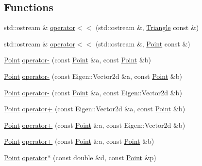 \subsection*{Functions}
\begin{DoxyCompactItemize}
\item 
std\-::ostream \& \hyperlink{namespaceTspeed_1_1Geo_aa258344d03758569a10613ac9e9c6321}{operator$<$$<$} (std\-::ostream \&, \hyperlink{classTspeed_1_1Geo_1_1Triangle}{Triangle} const \&)
\item 
std\-::ostream \& \hyperlink{namespaceTspeed_1_1Geo_a53dbf4dff78a9df28c8c7d1650c6680e}{operator$<$$<$} (std\-::ostream \&, \hyperlink{classTspeed_1_1Geo_1_1Point}{Point} const \&)
\item 
\hyperlink{classTspeed_1_1Geo_1_1Point}{Point} \hyperlink{namespaceTspeed_1_1Geo_adf8407948a35f7e96d5d799fa15b3650}{operator-\/} (const \hyperlink{classTspeed_1_1Geo_1_1Point}{Point} \&a, const \hyperlink{classTspeed_1_1Geo_1_1Point}{Point} \&b)
\item 
\hyperlink{classTspeed_1_1Geo_1_1Point}{Point} \hyperlink{namespaceTspeed_1_1Geo_a4ef6e700bdff1154b2721acce23cf6ad}{operator-\/} (const Eigen\-::\-Vector2d \&a, const \hyperlink{classTspeed_1_1Geo_1_1Point}{Point} \&b)
\item 
\hyperlink{classTspeed_1_1Geo_1_1Point}{Point} \hyperlink{namespaceTspeed_1_1Geo_a0a9c1c3252be0ddaf17736746ec30c24}{operator-\/} (const \hyperlink{classTspeed_1_1Geo_1_1Point}{Point} \&a, const Eigen\-::\-Vector2d \&b)
\item 
\hyperlink{classTspeed_1_1Geo_1_1Point}{Point} \hyperlink{namespaceTspeed_1_1Geo_af80150ec8874a02114d3c1761e668e8f}{operator+} (const Eigen\-::\-Vector2d \&a, const \hyperlink{classTspeed_1_1Geo_1_1Point}{Point} \&b)
\item 
\hyperlink{classTspeed_1_1Geo_1_1Point}{Point} \hyperlink{namespaceTspeed_1_1Geo_a9ba1b73207379c959a394ef5e51d7f01}{operator+} (const \hyperlink{classTspeed_1_1Geo_1_1Point}{Point} \&a, const Eigen\-::\-Vector2d \&b)
\item 
\hyperlink{classTspeed_1_1Geo_1_1Point}{Point} \hyperlink{namespaceTspeed_1_1Geo_a02b319fb63838ccd1fba19d6639dcd2e}{operator+} (const \hyperlink{classTspeed_1_1Geo_1_1Point}{Point} \&a, const \hyperlink{classTspeed_1_1Geo_1_1Point}{Point} \&b)
\item 
\hyperlink{classTspeed_1_1Geo_1_1Point}{Point} \hyperlink{namespaceTspeed_1_1Geo_a243dd04c499e998c82066b335dfe9d55}{operator$\ast$} (const double \&d, const \hyperlink{classTspeed_1_1Geo_1_1Point}{Point} \&p)
\end{DoxyCompactItemize}


